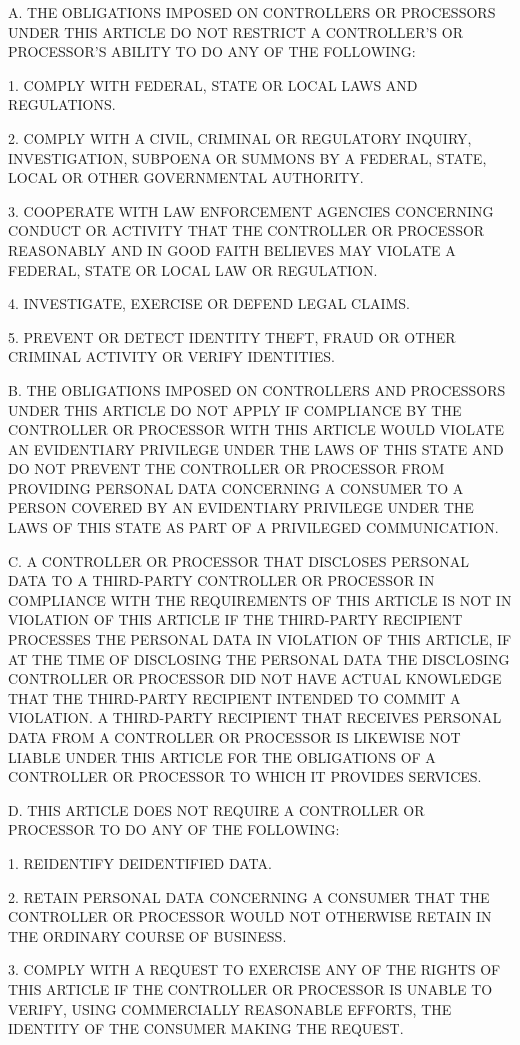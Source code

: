 A. THE OBLIGATIONS IMPOSED ON CONTROLLERS OR PROCESSORS UNDER THIS ARTICLE DO NOT RESTRICT A CONTROLLER'S OR PROCESSOR'S ABILITY TO DO ANY OF THE FOLLOWING:

1. COMPLY WITH FEDERAL, STATE OR LOCAL LAWS AND REGULATIONS.

2. COMPLY WITH A CIVIL, CRIMINAL OR REGULATORY INQUIRY, INVESTIGATION, SUBPOENA OR SUMMONS BY A FEDERAL, STATE, LOCAL OR OTHER GOVERNMENTAL AUTHORITY.

3. COOPERATE WITH LAW ENFORCEMENT AGENCIES CONCERNING CONDUCT OR ACTIVITY THAT THE CONTROLLER OR PROCESSOR REASONABLY AND IN GOOD FAITH BELIEVES MAY VIOLATE A FEDERAL, STATE OR LOCAL LAW OR REGULATION.

4. INVESTIGATE, EXERCISE OR DEFEND LEGAL CLAIMS.

5. PREVENT OR DETECT IDENTITY THEFT, FRAUD OR OTHER CRIMINAL ACTIVITY OR VERIFY IDENTITIES.

B. THE OBLIGATIONS IMPOSED ON CONTROLLERS AND PROCESSORS UNDER THIS ARTICLE DO NOT APPLY IF COMPLIANCE BY THE CONTROLLER OR PROCESSOR WITH THIS ARTICLE WOULD VIOLATE AN EVIDENTIARY PRIVILEGE UNDER THE LAWS OF THIS STATE AND DO NOT PREVENT THE CONTROLLER OR PROCESSOR FROM PROVIDING PERSONAL DATA CONCERNING A CONSUMER TO A PERSON COVERED BY AN EVIDENTIARY PRIVILEGE UNDER THE LAWS OF THIS STATE AS PART OF A PRIVILEGED COMMUNICATION.

C. A CONTROLLER OR PROCESSOR THAT DISCLOSES PERSONAL DATA TO A THIRD-PARTY CONTROLLER OR PROCESSOR IN COMPLIANCE WITH THE REQUIREMENTS OF THIS ARTICLE IS NOT IN VIOLATION OF THIS ARTICLE IF THE THIRD-PARTY RECIPIENT PROCESSES THE PERSONAL DATA IN VIOLATION OF THIS ARTICLE, IF AT THE TIME OF DISCLOSING THE PERSONAL DATA THE DISCLOSING CONTROLLER OR PROCESSOR DID NOT HAVE ACTUAL KNOWLEDGE THAT THE THIRD-PARTY RECIPIENT INTENDED TO COMMIT A VIOLATION. A THIRD-PARTY RECIPIENT THAT RECEIVES PERSONAL DATA FROM A CONTROLLER OR PROCESSOR IS LIKEWISE NOT LIABLE UNDER THIS ARTICLE FOR THE OBLIGATIONS OF A CONTROLLER OR PROCESSOR TO WHICH IT PROVIDES SERVICES.

D. THIS ARTICLE DOES NOT REQUIRE A CONTROLLER OR PROCESSOR TO DO ANY OF THE FOLLOWING:

1. REIDENTIFY DEIDENTIFIED DATA.

2. RETAIN PERSONAL DATA CONCERNING A CONSUMER THAT THE CONTROLLER OR PROCESSOR WOULD NOT OTHERWISE RETAIN IN THE ORDINARY COURSE OF BUSINESS.

3. COMPLY WITH A REQUEST TO EXERCISE ANY OF THE RIGHTS OF THIS ARTICLE IF THE CONTROLLER OR PROCESSOR IS UNABLE TO VERIFY, USING COMMERCIALLY REASONABLE EFFORTS, THE IDENTITY OF THE CONSUMER MAKING THE REQUEST.

